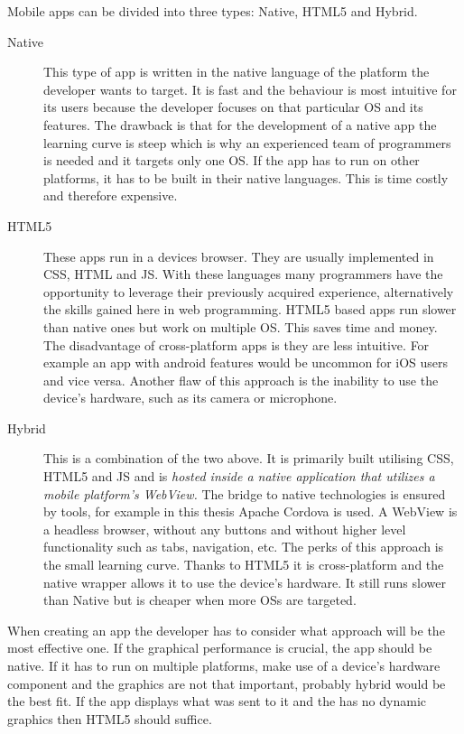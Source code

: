 Mobile apps can be divided into three types: Native, HTML5 and Hybrid.
\begin {description}
\item [Native] This type of app is written in the native language of the platform the developer wants to target. It is fast and the behaviour is most intuitive for its users because the developer focuses on that particular OS and its features. The drawback is that for the development of a native app the learning curve is steep which is why an experienced team of programmers is needed and it targets only one OS. If the app has to run on other platforms, it has to be built in their native languages. This is time costly and therefore expensive. 
\item [HTML5] These apps run in a devices browser. They are usually implemented in CSS, HTML and JS. With these languages many programmers have the opportunity to leverage their previously acquired experience, alternatively the skills gained here in web programming. HTML5 based apps run slower than native ones but work on multiple OS. This saves time and money. The disadvantage of cross-platform apps is they are less intuitive. For example an app with android features would be uncommon for iOS users and vice versa. Another flaw of this approach is the inability to use the device's hardware, such as its camera or microphone.
\item [Hybrid] This is a combination of the two above. It is primarily built utilising CSS, HTML5 and JS and is \textit{hosted inside a native application that utilizes a mobile platform’s WebView.} \cite{hybrid-mobile-app} The bridge to native technologies is ensured by tools, for example in this thesis Apache Cordova is used. A WebView is a headless browser, without any buttons and without higher level functionality such as tabs, navigation, etc. The perks of this approach is the small learning curve. Thanks to HTML5 it is cross-platform and the native wrapper allows it to use the device's hardware. It still runs slower than Native but is cheaper when more OSs are targeted.
\end{description}

When creating an app the developer has to consider what approach will be the most effective one. If the graphical performance is crucial, the app should be native. If it has to run on multiple platforms, make use of a device's hardware component and the graphics are not that important, probably hybrid would be the best fit. If the app displays what was sent to it and the has no dynamic graphics then HTML5 should suffice.

